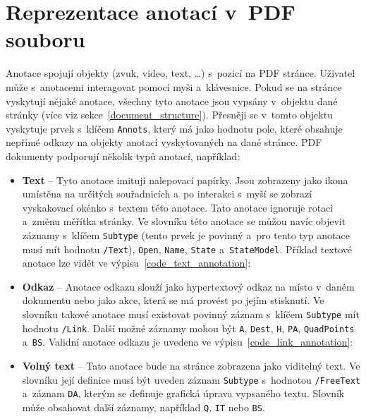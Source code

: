 \section{Reprezentace anotací v~PDF souboru} \label{PDF_annotations}
Anotace spojují objekty (zvuk, video, text, \dots) s~pozicí na PDF stránce.
Uživatel může s~anotacemi interagovat pomocí myši a~klávesnice.
Pokud se na stránce vyskytují nějaké anotace, všechny tyto anotace jsou vypsány
v~objektu dané stránky (více viz sekce~\ref{document_structure}). Přesněji
se v~tomto objektu vyskytuje prvek s~klíčem \texttt{Annots}, který má jako 
hodnotu pole, které obsahuje nepřímé odkazy na objekty anotací vyskytovaných
na dané stránce.
PDF dokumenty podporují několik typů anotací, 
například:
\begin{itemize}
    \item \textbf{Text} -- Tyto anotace imitují nalepovací papírky. Jsou
    zobrazeny jako ikona umístěna na určitých souřadnicích a~po interakci s~myší
    se zobrazí vyskakovací okénko s~textem této anotace. Tato anotace ignoruje
    rotaci a~změnu měřítka stránky. Ve slovníku této anotace se můžou navíc
    objevit záznamy s~klíčem \texttt{Subtype} (tento prvek je povinný a~pro tento
    typ anotace musí mít hodnotu \texttt{/Text}), \texttt{Open}, \texttt{Name},
    \texttt{State} a~\texttt{StateModel}. Příklad textové anotace lze vidět ve
    výpisu~\ref{code_text_annotation}:

    \item \textbf{Odkaz} -- Anotace odkazu slouží jako hypertextový
    odkaz na místo v~daném dokumentu nebo jako akce, která se má
    provést po jejím stisknutí. Ve slovníku takové anotace musí
    existovat povinný záznam s~klíčem \texttt{Subtype} mít hodnotu
    \texttt{/Link}. Další možné záznamy mohou být \texttt{A},
    \texttt{Dest}, \texttt{H}, \texttt{PA}, \texttt{QuadPoints}
    a~\texttt{BS}. Validní anotace odkazu je uvedena ve
    výpisu~\ref{code_link_annotation}:
    
    \item \textbf{Volný text} -- Tato anotace bude na stránce
    zobrazena jako viditelný text. Ve slovníku její definice
    musí být uveden záznam \texttt{Subtype} s~hodnotou
    \texttt{/FreeText} a~záznam \texttt{DA}, kterým se definuje
    grafická úprava vypsaného textu. Slovník může obsahovat další
    záznamy, například \texttt{Q}, \texttt{IT} nebo \texttt{BS}.
    

\end{itemize}
